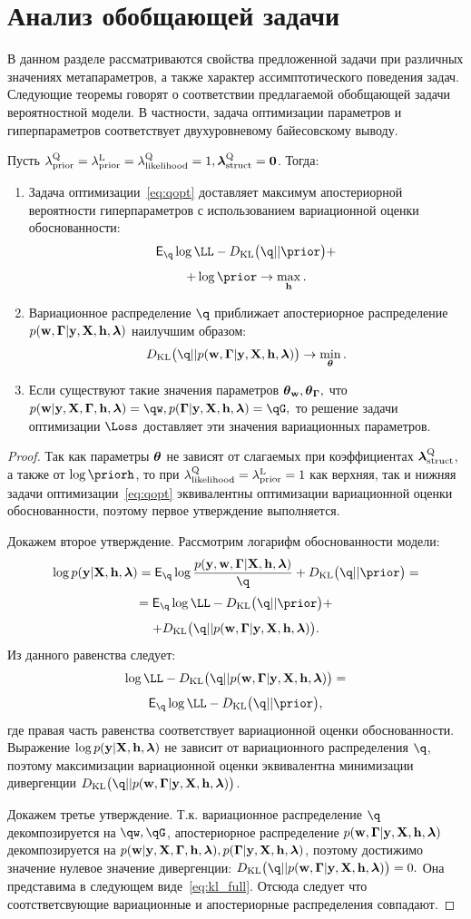 \section{Анализ обобщающей задачи}
В данном разделе рассматриваются свойства предложенной задачи при различных значениях метапараметров, а также характер ассимптотического поведения задач.
Следующие теоремы говорят о соответствии предлагаемой обобщающей задачи вероятностной модели. В частности, задача оптимизации параметров и гиперпараметров соответствует двухуровневому байесовскому выводу.
\begin{theorem}
Пусть ${\lambda_\text{prior}^\text{Q}} = \lambda_\text{prior}^\text{L}=\lambda_\text{likelihood}^\text{Q} = 1, \boldsymbol{\lambda}_\text{struct}^\text{Q}=\mathbf{0}$. Тогда:
\begin{enumerate}
\item Задача оптимизации~\eqref{eq:qopt} доставляет максимум апостериорной вероятности гиперпараметров с использованием вариационной оценки обоснованности:
\vspace{-0.3cm}
\[
    \E_{\q}\log \LL - \KL{\q}{\prior} +
\]
\[
+ \log \prior \to \max_{\h}.
\]
\item Вариационное распределение $\q$ приближает апостериорное распределение $p(\mathbf{w}, \boldsymbol{\Gamma}|\mathbf{y}, \mathbf{X}, \mathbf{h},\boldsymbol{\lambda})$ наилучшим образом:
\vspace{-0.3cm}
\[
    \KL{\q}{\post} \to \min_{\teta}.
\]


\item Если существуют такие значения параметров $\boldsymbol{\theta}_\mathbf{w}, \boldsymbol{\theta}_{\boldsymbol{\Gamma}},$ что $\postw = \qw, \postG = \qG,$
то решение задачи оптимизации $\Loss$ доставляет эти значения вариационных параметров.  
\end{enumerate}
\end{theorem}
\begin{proof}
Так как параметры $\boldsymbol{\theta}$ не зависят от слагаемых при коэффициентах $\boldsymbol{\lambda}_\text{struct}^\text{Q}$, а также от $\log \priorh$, то 
при $\lambda_\text{likelihood}^\text{Q} = \lambda_\text{prior}^\text{L} = 1$ как верхняя, так и нижняя задачи оптимизации~\eqref{eq:qopt} эквивалентны оптимизации вариационной оценки обоснованности, поэтому первое утверждение выполняется.

Докажем второе утверждение. Рассмотрим логарифм обоснованности модели: 
\[
\log \EV  = \E_{\q} \log\frac{p(\y, \w, \G|\X, \h, \lam)}{\q} + \KL{\q}{\prior} = 
 \]
\[
=\E_{\q} \log \LL - \KL{\q}{\prior}+
\]
\[
 + \KL{\q}{\post}.
\]
Из данного равенства следует:
\[
\log \LL - \KL{\q}{\post} = 
\]
\[
\E_{\q}\log \LL - \KL{\q}{\prior},
\]
где правая часть равенства соответствует вариационной оценки обоснованности. Выражение $\log p(\mathbf{y}|\mathbf{X}, \mathbf{h},\boldsymbol{\lambda})$ не зависит от вариационного распределения  $\q$, поэтому максимизации вариационной оценки эквивалентна минимизации дивергенции $\KL{\q}{\post}$.

Докажем третье утверждение. Т.к. вариационное распределение $\q$ декомпозируется на $\qw, \qG$, апостериорное распределение $p(\mathbf{w}, \boldsymbol{\Gamma}|\mathbf{y}, \mathbf{X}, \mathbf{h},\boldsymbol{\lambda})$ декомпозируется на $p(\mathbf{w}|\mathbf{y}, \mathbf{X}, \boldsymbol{\Gamma}, \mathbf{h},\boldsymbol{\lambda}), p(\boldsymbol{\Gamma}|\mathbf{y}, \mathbf{X}, \mathbf{h},\boldsymbol{\lambda})$, поэтому достижимо значение нулевое значение
дивергенции: $\KL{\q}{\post} = 0.$ Она представима в следующем виде~\eqref{eq:kl_full}.
Отсюда следует что соотстветсвующие вариационные и апостериорные распределения совпадают.
\end{proof}

